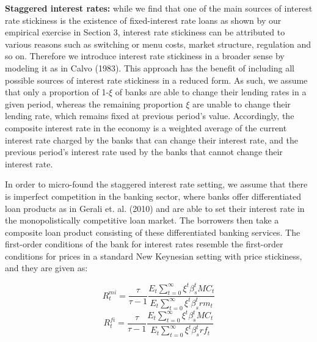 \documentclass[12pt]{article}
\numberwithin{equation}{section}
\begin{document}
\textbf{Staggered interest rates:} while we find that one of the main sources of interest rate stickiness is the existence of fixed-interest rate loans as shown by our empirical exercise in Section 3, interest rate stickiness can be attributed to various reasons such as switching or menu costs, market structure, regulation and so on. Therefore we introduce interest rate stickiness in a broader sense by modeling it as in Calvo (1983). This approach has the benefit of including all possible sources of interest rate stickiness in a reduced form. As such, we assume that only a proportion of 1-$\xi$ of banks are able to change their lending rates in a given period, whereas the remaining proportion $\xi$ are unable to change their lending rate, which remains fixed at previous period's value. Accordingly, the composite interest rate in the economy is a weighted average of the current interest rate charged by the banks that can change their interest rate, and the previous period's interest rate used by the banks that cannot change their interest rate. 

In order to micro-found the staggered interest rate setting, we assume that there is imperfect competition in the banking sector, where banks offer differentiated loan products as in Gerali et. al. (2010) and are able to set their interest rate in the monopolistically competitive loan market. The borrowers then take a composite loan product consisting of these differentiated banking services. The first-order conditions of the bank for interest rates resemble the first-order conditions for prices in a standard New Keynesian setting with price stickiness, and they are given as: 



\begin{equation}
R^{mi}_t=\frac{\tau}{\tau-1}\frac{E_t\sum _{t=0}^{\infty }\xi^t\beta_{s}^t MC_t}{E_t\sum _{t=0}^{\infty }\xi^t\beta_{s}^t rm_t}
\end{equation}
\begin{equation}
R^{fi}_t=\frac{\tau}{\tau-1}\frac{E_t\sum _{t=0}^{\infty }\xi^t\beta_{s}^t MC_t}{E_t\sum _{t=0}^{\infty }\xi^t\beta_{s}^t rf_t}
\end{equation}
\end{document}
